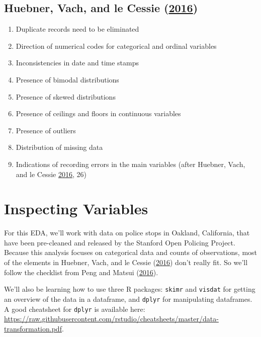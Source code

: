 \documentclass[
]{article}
\providecommand{\tightlist}{%
  \setlength{\itemsep}{0pt}\setlength{\parskip}{0pt}}
\begin{document}
\hypertarget{huebnersystematicapproachinitial2016}{%
\subsection{\texorpdfstring{Huebner, Vach, and le Cessie (\protect\hyperlink{ref-HuebnerSystematicApproachInitial2016}{2016})}{Huebner, Vach, and le Cessie (2016)}}\label{huebnersystematicapproachinitial2016}}

\begin{enumerate}
\def\labelenumi{\arabic{enumi}.}
\tightlist
\item
  Duplicate records need to be eliminated
\item
  Direction of numerical codes for categorical and ordinal variables
\item
  Inconsistencies in date and time stamps
\item
  Presence of bimodal distributions
\item
  Presence of skewed distributions
\item
  Presence of ceilings and floors in continuous variables
\item
  Presence of outliers
\item
  Distribution of missing data
\item
  Indications of recording errors in the main variables (after Huebner, Vach, and le Cessie \protect\hyperlink{ref-HuebnerSystematicApproachInitial2016}{2016}, 26)
\end{enumerate}

\hypertarget{inspecting-variables}{%
\section{Inspecting Variables}\label{inspecting-variables}}

For this EDA, we'll work with data on police stops in Oakland, California, that have been pre-cleaned and released by the Stanford Open Policing Project. Because this analysis focuses on categorical data and counts of observations, most of the elements in Huebner, Vach, and le Cessie (\protect\hyperlink{ref-HuebnerSystematicApproachInitial2016}{2016}) don't really fit. So we'll follow the checklist from Peng and Matsui (\protect\hyperlink{ref-PengArtDataScience2016}{2016}).

We'll also be learning how to use three R packages: \texttt{skimr} and \texttt{visdat} for getting an overview of the data in a dataframe, and \texttt{dplyr} for manipulating dataframes. A good cheatsheet for \texttt{dplyr} is available here: \url{https://raw.githubusercontent.com/rstudio/cheatsheets/master/data-transformation.pdf}.
\end{document}
